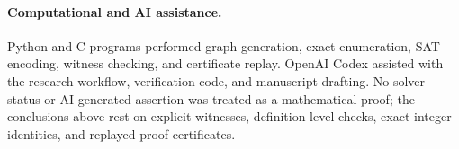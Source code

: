 \documentclass[11pt]{article}
\begin{document}
\paragraph{Computational and AI assistance.}
Python and C programs performed graph generation, exact enumeration,
SAT encoding, witness checking, and certificate replay.  OpenAI Codex
assisted with the research workflow, verification code, and manuscript
drafting.  No solver status or AI-generated assertion was treated as a
mathematical proof; the conclusions above rest on explicit witnesses,
definition-level checks, exact integer identities, and replayed proof
certificates.



\end{document}
